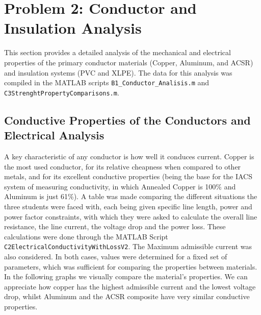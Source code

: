 \documentclass[12pt, a4paper]{article}
\begin{document}
\section{Problem 2: Conductor and Insulation Analysis}
This section provides a detailed analysis of the mechanical and electrical properties of the primary conductor materials (Copper, Aluminum, and ACSR) and insulation systems (PVC and XLPE). The data for this analysis was compiled in the MATLAB scripts \texttt{B1\_Conductor\_Analisis.m} and \texttt{C3StrenghtPropertyComparisons.m}.

\subsection{Conductive Properties of the Conductors and Electrical Analysis}
A key characteristic of any conductor is how well it conduces current. Copper is the most used conductor, for its relative cheapness when compared to other metals, and for its excellent conductive properties (being the base for the IACS system of measuring conductivity, in which Annealed Copper is 100\% and Aluminum is just 61\%). A table was made comparing the different situations the three students were faced with, each being given specific line length, power and power factor constraints, with which they were asked to calculate the overall line resistance, the line current, the voltage drop and the power loss. These calculations were done through the MATLAB Script \texttt{C2ElectricalConductivityWithLossV2}. The Maximum admissible current was also considered. In both cases, values were determined for a fixed set of parameters, which was sufficient for comparing the properties between materials. In the following graphs we visually compare the material's properties. We can appreciate how copper has the highest admissible current and the lowest voltage drop, whilst Aluminum and the ACSR composite have very similar conductive properties.
\end{document}
